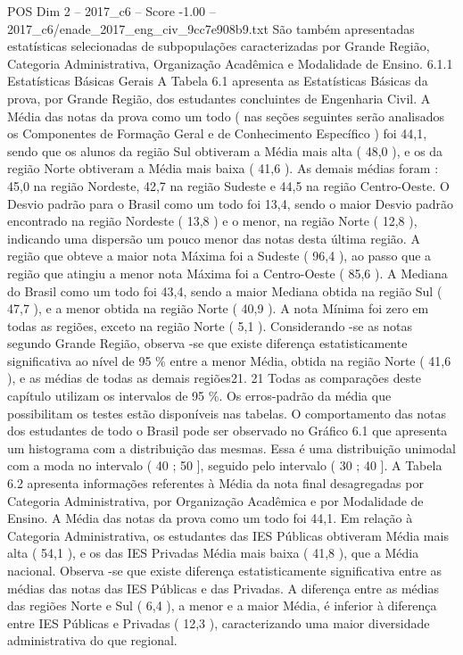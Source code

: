 \begin{textsample}{POS Dim 2 – 2017\_c6 – Score -1.00 – 2017\_c6/enade\_2017\_eng\_civ\_9cc7e908b9.txt}
São também apresentadas estatísticas selecionadas de subpopulações caracterizadas por Grande Região, Categoria Administrativa, Organização Acadêmica e Modalidade de Ensino. 6.1.1 Estatísticas Básicas Gerais A Tabela 6.1 apresenta as Estatísticas Básicas da prova, por Grande Região, dos estudantes concluintes de Engenharia Civil.
A Média das notas da prova como um todo ( nas seções seguintes serão analisados os Componentes de Formação Geral e de Conhecimento Específico ) foi 44,1, sendo que os alunos da região Sul obtiveram a Média mais alta ( 48,0 ), e os da região Norte obtiveram a Média mais baixa ( 41,6 ).
As demais médias foram : 45,0 na região Nordeste, 42,7 na região Sudeste e 44,5 na região Centro-Oeste.
O Desvio padrão para o Brasil como um todo foi 13,4, sendo o maior Desvio padrão encontrado na região Nordeste ( 13,8 ) e o menor, na região Norte ( 12,8 ), indicando uma dispersão um pouco menor das notas desta última região.
A região que obteve a maior nota Máxima foi a Sudeste ( 96,4 ), ao passo que a região que atingiu a menor nota Máxima foi a Centro-Oeste ( 85,6 ).
A Mediana do Brasil como um todo foi 43,4, sendo a maior Mediana obtida na região Sul ( 47,7 ), e a menor obtida na região Norte ( 40,9 ).
A nota Mínima foi zero em todas as regiões, exceto na região Norte ( 5,1 ).
Considerando -se as notas segundo Grande Região, observa -se que existe diferença estatisticamente significativa ao nível de 95 \% entre a menor Média, obtida na região Norte ( 41,6 ), e as médias de todas as demais regiões21. 21 Todas as comparações deste capítulo utilizam os intervalos de 95 \%.
Os erros-padrão da média que possibilitam os testes estão disponíveis nas tabelas.
O comportamento das notas dos estudantes de todo o Brasil pode ser observado no Gráfico 6.1 que apresenta um histograma com a distribuição das mesmas.
Essa é uma distribuição unimodal com a moda no intervalo ( 40 ; 50 ], seguido pelo intervalo ( 30 ; 40 ].
A Tabela 6.2 apresenta informações referentes à Média da nota final desagregadas por Categoria Administrativa, por Organização Acadêmica e por Modalidade de Ensino.
A Média das notas da prova como um todo foi 44,1.
Em relação à Categoria Administrativa, os estudantes das IES Públicas obtiveram Média mais alta ( 54,1 ), e os das IES Privadas Média mais baixa ( 41,8 ), que a Média nacional.
Observa -se que existe diferença estatisticamente significativa entre as médias das notas das IES Públicas e das Privadas.
A diferença entre as médias das regiões Norte e Sul ( 6,4 ), a menor e a maior Média, é inferior à diferença entre IES Públicas e Privadas ( 12,3 ), caracterizando uma maior diversidade administrativa do que regional.

\end{textsample}
